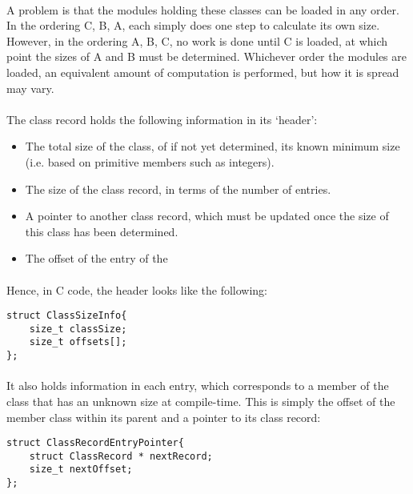 \documentclass{article}
\begin{document}
\paragraph{}
A problem is that the modules holding these classes can be loaded in any order. In the ordering C, B, A, each simply does one step to calculate its own size. However, in the ordering A, B, C, no work is done until C is loaded, at which point the sizes of A and B must be determined. Whichever order the modules are loaded, an equivalent amount of computation is performed, but how it is spread may vary.

\paragraph{}
The class record holds the following information in its `header':

\begin{itemize}
\item The total size of the class, of if not yet determined, its known minimum size (i.e. based on primitive members such as integers).
\item The size of the class record, in terms of the number of entries.
\item A pointer to another class record, which must be updated once the size of this class has been determined.
\item The offset of the entry of the 
\end{itemize}

\paragraph{}
Hence, in C code, the header looks like the following:

\begin{verbatim}
struct ClassSizeInfo{
    size_t classSize;
    size_t offsets[];
};
\end{verbatim}

\paragraph{}
It also holds information in each entry, which corresponds to a member of the class that has an unknown size at compile-time. This is simply the offset of the member class within its parent and a pointer to its class record:

\begin{verbatim}
struct ClassRecordEntryPointer{
    struct ClassRecord * nextRecord;
    size_t nextOffset;
};
\end{verbatim}
\end{document}
